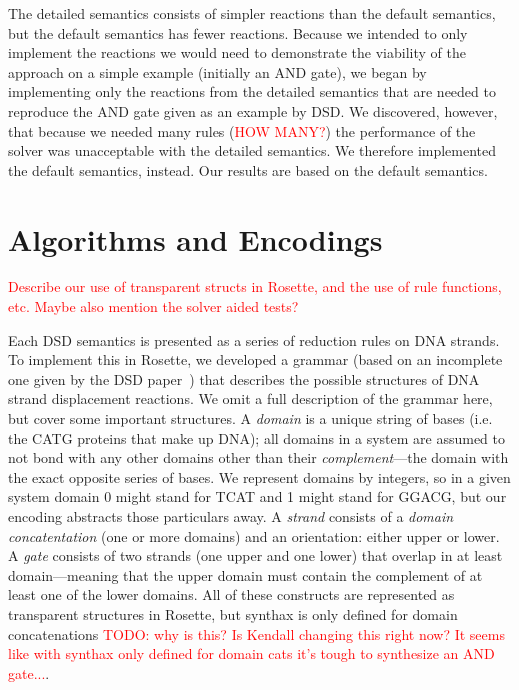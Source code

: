 \documentclass{article}
\begin{document}
The detailed semantics consists of simpler reactions than the default
semantics, but the default semantics has fewer reactions. Because we
intended to only implement the reactions we would need to demonstrate
the viability of the approach on a simple example (initially an
AND gate), we began by implementing only the reactions from the
detailed semantics that are needed to reproduce the AND gate given as
an example by DSD. We discovered, however, that because we needed many
rules (\textcolor{red}{HOW MANY?}) the performance of the solver was
unacceptable with the detailed semantics. We therefore implemented the
default semantics, instead. Our results are based on the default semantics.

\section{Algorithms and Encodings}

\textcolor{red}{Describe our use of transparent structs in Rosette,
  and the use of rule functions, etc. Maybe also mention the solver
  aided tests?}

Each DSD semantics is presented as a series of reduction rules on DNA
strands.  To implement this in Rosette, we developed a grammar (based
on an incomplete one given by the DSD paper~\cite{dsd}) that describes
the possible structures of DNA strand displacement reactions. We omit
a full description of the grammar here, but cover some important
structures.  A \emph{domain} is a unique string of bases (i.e. the
CATG proteins that make up DNA); all domains in a system are assumed
to not bond with any other domains other than their
\emph{complement}---the domain with the exact opposite series of
bases. We represent domains by integers, so in a given system domain 0
might stand for TCAT and 1 might stand for GGACG, but our encoding
abstracts those particulars away. A \emph{strand} consists of a
\emph{domain concatentation} (one or more domains) and an orientation:
either upper or lower.  A \emph{gate} consists of two strands (one
upper and one lower) that overlap in at least domain---meaning that
the upper domain must contain the complement of at least one of the
lower domains. All of these constructs are represented as transparent
structures in Rosette, but synthax is only defined for domain
concatenations \textcolor{red}{TODO: why is this? Is Kendall changing
  this right now? It seems like with synthax only defined for domain
  cats it's tough to synthesize an AND gate...}.
\end{document}
